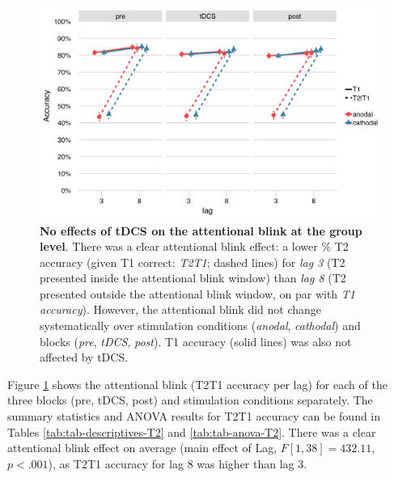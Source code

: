 \documentclass[11pt,]{memoir}
\begin{document}
\begin{figure}
\includegraphics[width=5.5in]{AB_tDCS_files/figures/figure_3_group} \caption{\textbf{No effects of tDCS on the attentional blink at the group level}. There was a clear attentional blink effect: a lower \% T2 accuracy (given T1 correct: \emph{T2\textbar{}T1}; dashed lines) for \emph{lag 3} (T2 presented inside the attentional blink window) than \emph{lag 8} (T2 presented outside the attentional blink window, on par with \emph{T1 accuracy}). However, the attentional blink did not change systematically over stimulation conditions (\emph{anodal}, \emph{cathodal}) and blocks (\emph{pre}, \emph{tDCS}, \emph{post}). T1 accuracy (solid lines) was also not affected by tDCS.}\label{fig:fig-group}
\end{figure}



Figure \ref{fig:fig-group} shows the attentional blink (T2\textbar{}T1 accuracy per lag) for each of the three blocks (pre, tDCS, post) and stimulation conditions separately. The summary statistics and ANOVA results for T2\textbar{}T1 accuracy can be found in Tables \ref{tab:tab-descriptives-T2} and \ref{tab:tab-anova-T2}. There was a clear attentional blink effect on average (main effect of Lag, \(F[1, 38] = 432.11\), \(p < .001\)), as T2\textbar{}T1 accuracy for lag 8 was higher than lag 3.
\end{document}
